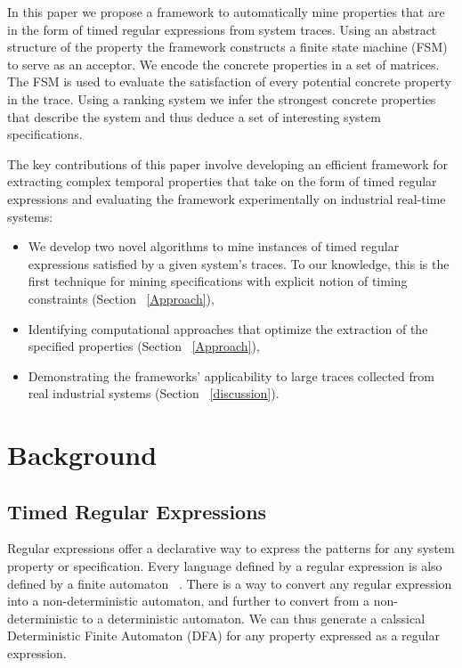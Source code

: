 \documentclass[]{sigplanconf}
\begin{document}
In this paper we propose a framework to automatically mine properties that are in the form of timed regular expressions from system traces. Using an abstract structure of the property the framework constructs a finite state machine (FSM) to serve as an acceptor. We encode the concrete properties in a set of matrices. The FSM is used to evaluate the satisfaction of every potential concrete property in the trace. Using a ranking system we infer the strongest concrete properties that describe the system and thus deduce a set of interesting system specifications.

The key contributions of this paper involve developing an efficient framework for extracting complex temporal properties that take on the form of timed regular expressions and evaluating the framework experimentally on industrial real-time systems:

\begin{itemize}
\item We develop two novel algorithms to mine instances of timed regular expressions satisfied by a given system's traces. To our knowledge, this is the first technique for mining specifications with explicit notion of timing constraints (Section ~\ref{Approach}),
\item Identifying computational approaches that optimize the extraction of the specified properties (Section ~\ref{Approach}),
\item Demonstrating the frameworks' applicability to large traces collected from real industrial systems  (Section ~\ref{discussion}).
\end{itemize}

\section{Background} \label{Background}

\subsection{Timed Regular Expressions}

Regular expressions offer a declarative way to express the patterns for any system property or specification. Every language defined by a regular expression is also defined by a finite automaton ~\cite{book1}. There is a way to convert any regular expression into a non-deterministic automaton, and further to convert from a non-deterministic to a deterministic automaton. We can thus generate a calssical Deterministic Finite Automaton (DFA) for any property expressed as a regular expression.
\end{document}
